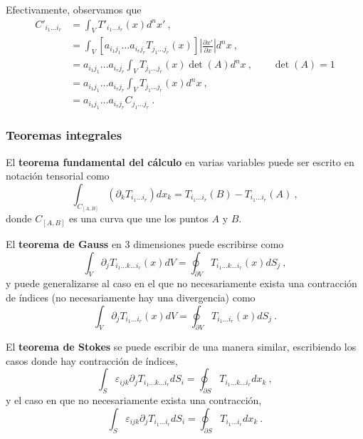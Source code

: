 Efectivamente, observamos que
\begin{align}
    C'_{i_1 \dots i_r} & = \int_V T'_{i_1 \dots i_r}(x) d^n x' \ , \\
    & = \int_V [a_{i_1 j_1} \dots a_{i_r j_r} T_{j_1 \dots j_r}(x)] \left| \frac{\partial x'}{\partial x} \right| d^n x \ , \\
    & = a_{i_1 j_1} \dots a_{i_r j_r} \int_V T_{j_1 \dots j_r}(x) \det(A) d^n x \ , \qquad \det(A) = 1 \\
    & = a_{i_1 j_1} \dots a_{i_r j_r} \int_V T_{j_1 \dots j_r}(x) d^n x \ , \\
    & = a_{i_1 j_1} \dots a_{i_r j_r} C_{j_1 \dots j_r} \ .
\end{align}

\subsubsection*{Teoremas integrales}

El \textbf{teorema fundamental del cálculo} en varias variables puede ser escrito en notación tensorial como
\begin{equation}
    \int_{C_{[A,B]}} (\partial_k T_{i_1 \dots i_r}) dx_k = T_{i_1 \dots i_r}(B) - T_{i_1 \dots i_r}(A) \ ,
\end{equation}
donde $C_{[A,B]}$ es una curva que une los puntos $A$ y $B$.

El \textbf{teorema de Gauss} en 3 dimensiones puede escribirse como
\begin{equation}
    \int_V \partial_j T_{i_1 \dots k \dots i_r}(x) dV = \oint_{\partial V} T_{i_1 \dots k \dots i_r} (x) dS_j \ ,
\end{equation}
y puede generalizarse al caso en el que no necesariamente exista una contracción de índices (no necesariamente hay una divergencia) como
\begin{equation}
    \int_V \partial_j T_{i_1 \dots i_r}(x) dV = \oint_{\partial V} T_{i_1 \dots i_r} (x) dS_j \ .
\end{equation}

El \textbf{teorema de Stokes} se puede escribir de una manera similar, escribiendo los casos donde hay contracción de índices,
\begin{equation}
    \int_S \varepsilon_{ijk} \partial_j T_{i_1 \dots k \dots i_r} dS_i = \oint_{\partial S} T_{i_1 \dots k \dots i_r} dx_k \ ,
\end{equation}
y el caso en que no necesariamente exista una contracción,
\begin{equation}
    \int_S \varepsilon_{ijk} \partial_j T_{i_1 \dots i_r} dS_i = \oint_{\partial S} T_{i_1 \dots i_r} dx_k \ .
\end{equation}


